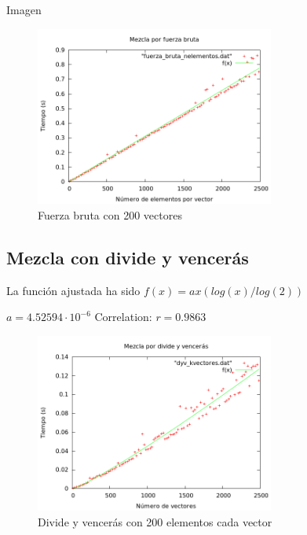 \begin{frame}{Imagen}
	\begin{exampleblock}
	
	\begin{figure}[h] 
	\includegraphics[width=0.7\textwidth]
	{../Obligatorio/Graficas/fuerza_bruta_nelementos.png}
	\caption{Fuerza bruta con 200 vectores} 
	\end{figure}
	
	\end{exampleblock}
\end{frame}


\subsection{Mezcla con divide y vencer\'as}
\begin{frame}
	\begin{block}

	La funci\'on ajustada ha sido $f(x) = ax(log(x)/log(2))$

	\begin{center}	
	$a               = 4.52594\cdot 10^{-6}$
	Correlation:  $r = 0.9863$
	\end{center}
	\end{block}
\end{frame}

\begin{frame}[Imagen]
	\begin{block}
	
	\begin{figure}[h] 
	\centering
	\includegraphics[width=0.7\textwidth]{../Obligatorio/Graficas/dyv_kvectores.png}
	\caption{Divide y vencerás con 200 elementos cada vector} 
	\end{figure}
	
	\end{block}
\end{frame}

